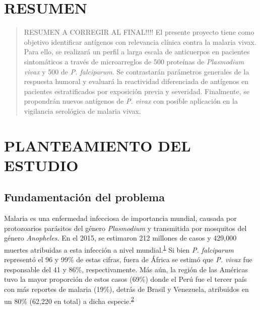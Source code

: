 \documentclass[]{article}
\begin{document}
\vfill
\restoregeometry
\clearpage

\newpage

\tableofcontents

\newpage


\section{RESUMEN}\label{resumen}

\begin{quote}
RESUMEN A CORREGIR AL FINAL!!!! El presente proyecto tiene como objetivo
identificar antígenos con relevancia clínica contra la malaria vivax.
Para ello, se realizará un perfil a larga escala de anticuerpos en
pacientes sintomáticos a través de microarreglos de 500 proteínas de
\emph{Plasmodium vivax} y 500 de \emph{P. falciparum}. Se contrastarán
parámetros generales de la respuesta humoral y evaluará la reactividad
diferenciada de antígenos en pacientes estratificados por exposición
previa y severidad. Finalmente, se propondrán nuevos antígenos de
\emph{P. vivax} con posible aplicación en la vigilancia serológica de
malaria vivax.
\end{quote}

\section{PLANTEAMIENTO DEL ESTUDIO}\label{planteamiento-del-estudio}

\subsection{Fundamentación del problema}\label{intro}

Malaria es una enfermedad infecciosa de importancia mundial, causada por
protozoarios parásitos del género \emph{Plasmodium} y transmitida por
mosquitos del género \emph{Anopheles}. En el 2015, se estimaron 212
millones de casos y 429,000 muertes atribuidas a esta infección a nivel
mundial.\textsuperscript{\protect\hyperlink{ref-WHO2016world}{1}} Si
bien \emph{P. falciparum} representó el 96 y 99\% de estas cifras, fuera
de África se estimó que \emph{P. vivax} fue responsable del 41 y 86\%,
respectivamente. Más aún, la región de las Américas tuvo la mayor
proporción de estos casos (69\%) donde el Perú fue el tercer país con
más reportes de malaria (19\%), detrás de Brasil y Venezuela, atribuidos
en un 80\% (62,220 en total) a dicha
especie.\textsuperscript{\protect\hyperlink{ref-rosas2016peru}{2}}
\end{document}

